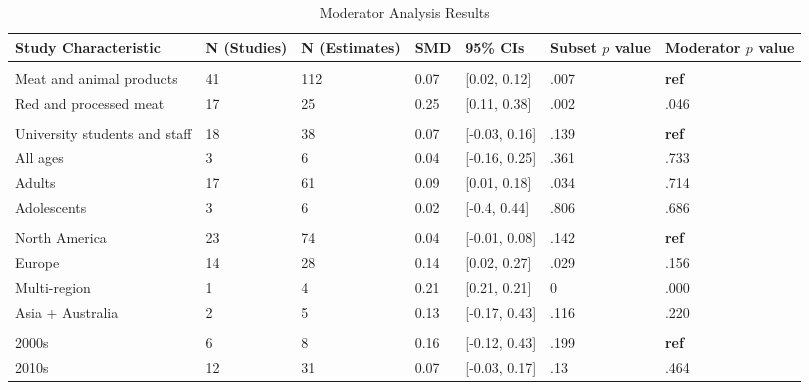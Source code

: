 \documentclass[sn-nature,referee,pdflatex]{sn-jnl}
\begin{document}
\begin{table}[!ht]
\centering
\caption{\label{tab:table_two}Moderator Analysis Results}
\centering
\begin{tabular}[t]{lllllll}
\toprule
Study Characteristic & N (Studies) & N (Estimates) & SMD & 95\% CIs & Subset $p$ value & Moderator $p$ value\\
\midrule
\addlinespace[0.3em]
\multicolumn{7}{l}{\textbf{Outcome}}\\
\hspace{1em}Meat and animal products & 41 & 112 & 0.07 & {}[0.02, 0.12] & .007 & \textbf{ref}\\
\hspace{1em}Red and processed meat & 17 & 25 & 0.25 & {}[0.11, 0.38] & .002 & .046\\
\addlinespace[0.3em]
\multicolumn{7}{l}{\textbf{Population}}\\
\hspace{1em}University students and staff & 18 & 38 & 0.07 & {}[-0.03, 0.16] & .139 & \textbf{ref}\\
\hspace{1em}All ages & 3 & 6 & 0.04 & {}[-0.16, 0.25] & .361 & .733\\
\hspace{1em}Adults & 17 & 61 & 0.09 & {}[0.01, 0.18] & .034 & .714\\
\hspace{1em}Adolescents & 3 & 6 & 0.02 & {}[-0.4, 0.44] & .806 & .686\\
\addlinespace[0.3em]
\multicolumn{7}{l}{\textbf{Region}}\\
\hspace{1em}North America & 23 & 74 & 0.04 & {}[-0.01, 0.08] & .142 & \textbf{ref}\\
\hspace{1em}Europe & 14 & 28 & 0.14 & {}[0.02, 0.27] & .029 & .156\\
\hspace{1em}Multi-region & 1 & 4 & 0.21 & {}[0.21, 0.21] & 0 & .000\\
\hspace{1em}Asia + Australia & 2 & 5 & 0.13 & {}[-0.17, 0.43] & .116 & .220\\
\addlinespace[0.3em]
\multicolumn{7}{l}{\textbf{Publication Decade}}\\
\hspace{1em}2000s & 6 & 8 & 0.16 & {}[-0.12, 0.43] & .199 & \textbf{ref}\\
\hspace{1em}2010s & 12 & 31 & 0.07 & {}[-0.03, 0.17] & .13 & .464\\

\end{tabular}
\end{table}
\end{document}

